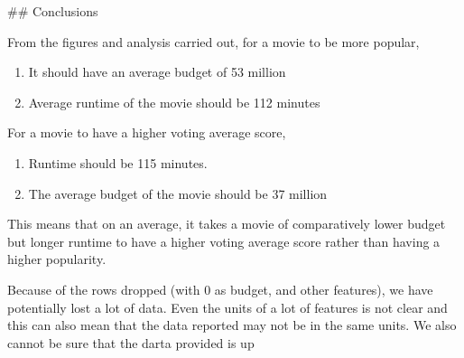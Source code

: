 \documentclass[11pt]{article}
\providecommand{\tightlist}{%
      \setlength{\itemsep}{0pt}\setlength{\parskip}{0pt}}
\begin{document}
     \#\# Conclusions

From the figures and analysis carried out, for a movie to be more
popular,

\begin{enumerate}
\def\labelenumi{\arabic{enumi}.}
\tightlist
\item
  It should have an average budget of 53 million
\item
  Average runtime of the movie should be 112 minutes
\end{enumerate}

For a movie to have a higher voting average score,

\begin{enumerate}
\def\labelenumi{\arabic{enumi}.}
\tightlist
\item
  Runtime should be 115 minutes.
\item
  The average budget of the movie should be 37 million
\end{enumerate}

This means that on an average, it takes a movie of comparatively lower
budget but longer runtime to have a higher voting average score rather
than having a higher popularity.

Because of the rows dropped (with 0 as budget, and other features), we
have potentially lost a lot of data. Even the units of a lot of features
is not clear and this can also mean that the data reported may not be in
the same units. We also cannot be sure that the darta provided is up


    
    
    
    
\end{document}
